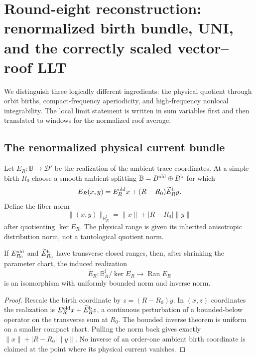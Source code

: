 \section{Round-eight reconstruction: renormalized birth bundle, UNI, and the correctly scaled vector--roof LLT}
\label{sec:r8-a2}

We distinguish three logically different ingredients: the physical quotient
through orbit births, compact-frequency aperiodicity, and high-frequency
nonlocal integrability.  The local limit statement is written in sum variables
first and then translated to windows for the normalized roof average.

\subsection{The renormalized physical current bundle}

Let $E_R:\mathbb B\to\mathscr D'$ be the realization of the ambient trace
coordinates.  At a simple birth $R_0$ choose a smooth ambient splitting
$\mathbb B=B^{\rm old}\oplus B^{\rm b}$ for which
\[
 E_R(x,y)=E_R^{\rm old}x+(R-R_0)\widetilde E_R^{\rm b}y.
\]
Define the fiber norm
\[
 \|(x,y)\|_{\mathbb B_R^\sharp}
 =\|x\|+|R-R_0|\|y\|
\]
after quotienting $\ker E_R$.  The physical range is given its inherited
anisotropic distribution norm, not a tautological quotient norm.

\begin{lemma}
\label{lem:r8-a2-birth}
If $E_{R_0}^{\rm old}$ and $\widetilde E_{R_0}^{\rm b}$ have transverse closed
ranges, then, after shrinking the parameter chart, the induced realization
\[
 \overline E_R:\mathbb B_R^\sharp/\ker E_R\longrightarrow\operatorname{Ran}E_R
\]
is an isomorphism with uniformly bounded norm and inverse norm.
\end{lemma}

\begin{proof}
Rescale the birth coordinate by $z=(R-R_0)y$.  In $(x,z)$ coordinates the
realization is $E_R^{\rm old}x+\widetilde E_R^{\rm b}z$, a continuous
perturbation of a bounded-below operator on the transverse sum at $R_0$.
The bounded inverse theorem is uniform on a smaller compact chart.  Pulling the
norm back gives exactly $\|x\|+|R-R_0|\|y\|$.  No inverse of an order-one
ambient birth coordinate is claimed at the point where its physical current
vanishes.
\end{proof}

